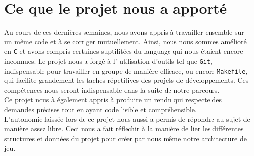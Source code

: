 \section{Ce que le projet nous a apporté}
    Au cours de ces dernières semaines, nous avons appris à travailler ensemble sur un même code et à se corriger mutuellement. Ainsi, nous nous sommes amélioré en \texttt{C} et avons compris certaines suptilitées du language qui nous étaient encore inconnues. Le projet nous a forgé à l' utilisation d'outils tel que \texttt{Git}, indispensable pour travailler en groupe de manière efficace, ou encore \texttt{Makefile}, qui facilite grandement les taches répetitives des projets de développements. Ces compétences nous seront indispensable dans la suite de notre parcours.  \\
    Ce projet nous à également appris à produire un rendu qui respecte des demandes précises tout en ayant code lisible et compréhensible. \\
    L'autonomie laissée lors de ce projet nous aussi a permis de répondre au sujet de manière assez libre. Ceci nous a fait réflechir à la manière de lier les différentes structures et données du projet pour créer par nous même notre architecture de jeu.